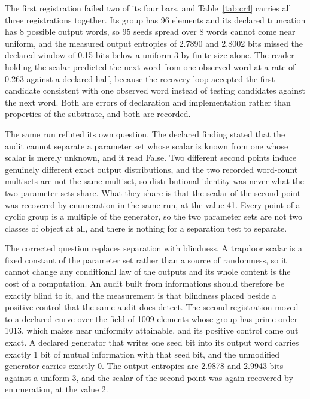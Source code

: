 \documentclass[aps,pre,reprint,nofootinbib]{revtex4-2}
\begin{document}
The first registration failed two of its four bars, and
Table~\ref{tab:cr4} carries all three registrations together.  Its
group has 96 elements and its declared truncation has 8 possible
output words, so 95 seeds spread over 8 words cannot come near
uniform, and the
measured output entropies of 2.7890 and 2.8002 bits missed the
declared window of 0.15 bits below a uniform 3 by finite size alone.
The reader holding the scalar predicted the next word from one
observed word at a rate of 0.263 against a declared half, because the
recovery loop accepted the first candidate consistent with one
observed word instead of testing candidates against the next word.
Both are errors of declaration and implementation rather than
properties of the substrate, and both are recorded.

The same run refuted its own question.  The declared finding stated
that the audit cannot separate a parameter set whose scalar is known
from one whose scalar is merely unknown, and it read
False.  Two different second points induce
genuinely different exact output distributions, and the two recorded
word-count multisets are not the same multiset, so distributional
identity was never what the two parameter sets share.  What they share
is that the scalar of the second point was recovered by enumeration in
the same run, at the value 41.  Every point of a cyclic group is a
multiple of the generator, so the two parameter sets are not two
classes of object at all, and there is nothing for a separation test
to separate.

The corrected question replaces separation with blindness.  A trapdoor
scalar is a fixed constant of the parameter set rather than a source
of randomness, so it cannot change any conditional law of the outputs
and its whole content is the cost of a computation.  An audit built
from informations should therefore be exactly blind to it, and the
measurement is that blindness placed beside a positive control that
the same audit does detect.  The second registration moved to a
declared curve over the field of 1009 elements whose group has prime
order 1013, which makes near uniformity attainable, and its positive
control came out exact.  A declared generator that writes one seed bit
into its output word carries exactly 1 bit of mutual information with
that seed bit, and the unmodified generator carries exactly 0.  The
output entropies are 2.9878 and 2.9943 bits against a uniform 3, and
the scalar of the second point was again recovered by enumeration, at
the value 2.
\end{document}

